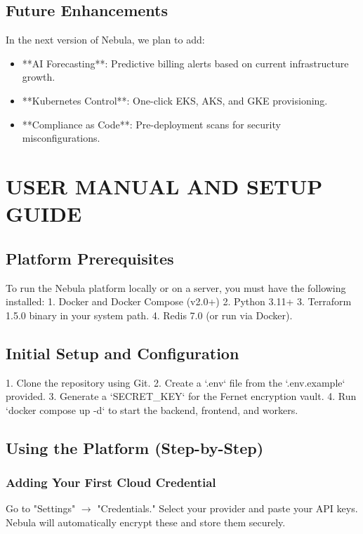 \section{Future Enhancements}
In the next version of Nebula, we plan to add:
\begin{itemize}
    \item **AI Forecasting**: Predictive billing alerts based on current infrastructure growth.
    \item **Kubernetes Control**: One-click EKS, AKS, and GKE provisioning.
    \item **Compliance as Code**: Pre-deployment scans for security misconfigurations.
\end{itemize}

\newpage
\appendix
\chapter{USER MANUAL AND SETUP GUIDE}

\section{Platform Prerequisites}
To run the Nebula platform locally or on a server, you must have the following installed:
1. Docker and Docker Compose (v2.0+)
2. Python 3.11+
3. Terraform 1.5.0 binary in your system path.
4. Redis 7.0 (or run via Docker).

\section{Initial Setup and Configuration}
1. Clone the repository using Git.
2. Create a `.env` file from the `.env.example` provided.
3. Generate a `SECRET_KEY` for the Fernet encryption vault.
4. Run `docker compose up -d` to start the backend, frontend, and workers.

\section{Using the Platform (Step-by-Step)}
\subsection{Adding Your First Cloud Credential}
Go to "Settings" $\rightarrow$ "Credentials." Select your provider and paste your API keys. Nebula will automatically encrypt these and store them securely.

